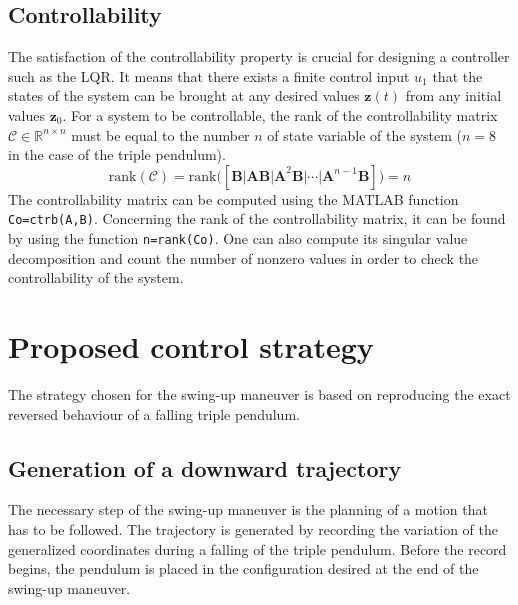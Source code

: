 \documentclass[a4paper,12pt]{article}
\begin{document}
\subsection{Controllability}
The satisfaction of the controllability property is crucial for designing a controller such as the LQR. It means that there exists a finite control input $u_1$ that the states of the system can be brought at any desired values $\mathbf{z}(t)$ from any initial values $\mathbf{z}_0$. For a system to be controllable, the rank of the controllability matrix $\mathcal{C}\in\mathbb{R}^{n\times n}$ must be equal to the number $n$ of state variable of the system ($n=8$ in the case of the triple pendulum).
\[ \text{rank}\left(\mathcal{C}\right) = \text{rank}\Big(\left[ \mathbf{B|AB|A}^2\mathbf{B}|\cdots|\mathbf{A}^{n-1}\mathbf{B} \right]\Big) =n \]
The controllability matrix can be computed using the MATLAB function \texttt{Co=ctrb(A,B)}. Concerning the rank of the controllability matrix, it can be found by using the function \texttt{n=rank(Co)}. One can also compute its singular value decomposition and count the number of nonzero values in order to check the controllability of the system.

\section{Proposed control strategy}
The strategy chosen for the swing-up maneuver is based on reproducing the exact reversed behaviour of a falling triple pendulum.

\subsection{Generation of a downward trajectory} \label{sec:down_trajectory}
The necessary step of the swing-up maneuver is the planning of a motion that has to be followed. The trajectory is generated by recording the variation of the generalized coordinates during a falling of the triple pendulum. Before the record begins, the pendulum is placed in the configuration desired at the end of the swing-up maneuver. 
\end{document}

